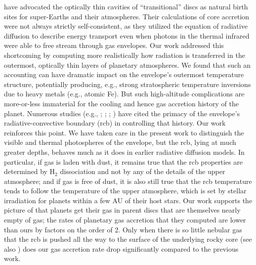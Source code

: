 \documentclass[fleqn,useAMS,usenatbib]{mnras}
\begin{document}
\citet{paper3} have advocated the optically thin cavities
of ``transitional'' discs
as natural birth sites for super-Earths and their atmospheres.
Their calculations of core accretion were not 
always strictly self-consistent,
as they utilized the equation of radiative diffusion
to describe energy transport even when photons
in the thermal infrared were able to free stream
through gas envelopes.
Our work addressed this shortcoming by 
computing more realistically how radiation is transferred
in the outermost, optically thin layers of planetary atmospheres.
We found that such an accounting can have dramatic
impact on the envelope's outermost temperature structure, potentially
producing, e.g.,
strong stratospheric temperature inversions due to heavy
metals (e.g., atomic Fe). But such high-altitude complications
are more-or-less
immaterial for the cooling and hence gas accretion history of the planet.
Numerous studies (e.g., \citealt{piso14}; \citealt{paper2}; \citealt{paper3}; \citealt{ginzburg16}) have cited the primacy of the envelope's radiative-convective
boundary (rcb) in controlling that history. Our work reinforces
this point. We have taken care in the present work
to distinguish the visible and thermal
photospheres of the envelope, but the rcb,
lying at much greater depths,
behaves much as it does in earlier radiative diffusion models. In particular,
if gas is laden with dust, it remains true that the rcb properties
are determined by H$_2$ dissociation and not by any of the
details of the upper atmosphere; and if gas is free of dust, it is also still
true that the rcb temperature tends to follow the temperature of the upper
atmosphere, which is set by stellar irradiation for planets within a few AU
of their host stars.
Our work supports the picture of \citet{paper3}
that planets get their gas in parent discs that are themselves
nearly empty of gas; the rates of planetary gas accretion
that they computed are lower
than ours by factors on the order of 2. 
Only when there is so little nebular gas that the rcb is pushed all the way to the surface of the underlying rocky core 
(see also \citealt{ginzburg17}) 
does our gas accretion rate drop significantly compared to the previous work.
\end{document}
